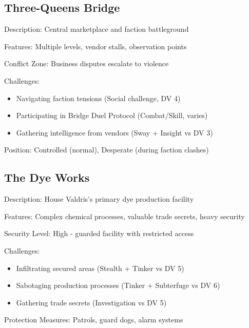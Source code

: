 \documentclass[11pt]{article}
\newenvironment{location}[1]{\begin{description}[leftmargin=*,style=standard]\item[\textbf{#1}]}{\end{description}}
\begin{document}
\subsection{Three-Queens Bridge}
\begin{location}{Three-Queens Bridge}
\item[Description:] Central marketplace and faction battleground
\item[Features:] Multiple levels, vendor stalls, observation points
\item[Conflict Zone:] Business disputes escalate to violence
\item[Challenges:] 
  \begin{itemize}
    \item Navigating faction tensions (Social challenge, DV 4)
    \item Participating in Bridge Duel Protocol (Combat/Skill, varies)
    \item Gathering intelligence from vendors (Sway + Insight vs DV 3)
  \end{itemize}
\item[Position:] Controlled (normal), Desperate (during faction clashes)
\end{location}

\subsection{The Dye Works}
\begin{location}{The Dye Works}
\item[Description:] House Valdris's primary dye production facility
\item[Features:] Complex chemical processes, valuable trade secrets, heavy security
\item[Security Level:] High - guarded facility with restricted access
\item[Challenges:] 
  \begin{itemize}
    \item Infiltrating secured areas (Stealth + Tinker vs DV 5)
    \item Sabotaging production processes (Tinker + Subterfuge vs DV 6)
    \item Gathering trade secrets (Investigation vs DV 5)
  \end{itemize}
\item[Protection Measures:] Patrols, guard dogs, alarm systems
\end{location}
\end{document}
